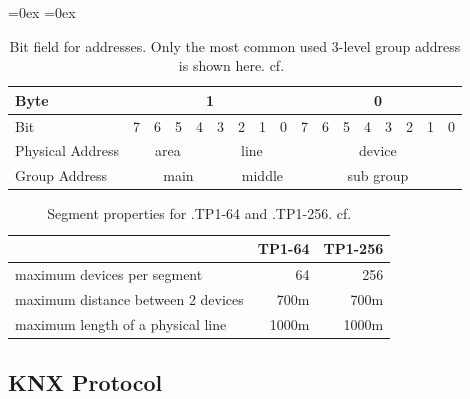 \begin{table}
	\aboverulesep=0ex
	\belowrulesep=0ex
	\renewcommand{\arraystretch}{1.2}
	
	\centering
	\begin{tabular}{|l|c|c|c|c|c|c|c|c|c|c|c|c|c|c|c|c|}
		\toprule
		Byte & \multicolumn{8}{c|}{1} & \multicolumn{8}{c|}{0} \\\midrule
		Bit & 7 & 6 & 5 & 4 & 3 & 2 & 1 & 0 & 7 & 6 & 5 & 4 & 3 & 2 & 1 & 0\\\midrule
		Physical Address & \multicolumn{4}{c|}{area} & \multicolumn{4}{c|}{line} & \multicolumn{8}{c|}{device}\\\midrule
		Group Address & \multicolumn{5}{c|}{main} & \multicolumn{3}{c|}{middle} & \multicolumn{8}{c|}{sub group}\\
		\bottomrule
	\end{tabular}
	\caption[Bit field for \knx addresses]{Bit field for \knx addresses. Only the most common used 3-level group address is shown here. cf.~\textcite{Merz2009,Sokollik2017} }
	\label{tab:background:bas:knx:topo:addr}
\end{table}

\begin{table}
	\centering
	\begin{tabular}{l r r }
	 & \textbf{TP1-64} & \textbf{TP1-256} \\\toprule
	 maximum devices per segment & 64 & 256 \\
	 maximum distance between 2 devices & 700m & 700m \\
	 maximum length of a physical line & 1000m & 1000m \\
	 \bottomrule
	\end{tabular}
	\caption[Segment properties for \knx.TP1-64 and \knx.TP1-256]{Segment properties for \knx.TP1-64 and \knx.TP1-256. cf. \textcite{Sokollik2017} }
	\label{tab:background:bas:knx:topo:tpsegments}
\end{table}

\subsection{KNX Protocol}
\label{sec:background:bas:knx:proto}

